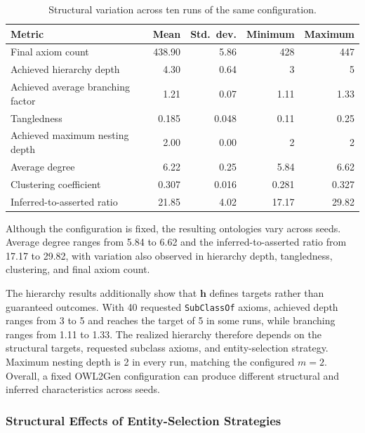 {\small
\begin{table}[htbp]
\centering
\caption{Structural variation across ten runs of the same configuration.}
\label{tab:metric-summary}
\small
\begin{tabular}{lrrrr}
\toprule
Metric & Mean & Std.\ dev. & Minimum & Maximum \\
\midrule
Final axiom count                 & 438.90 & 5.86  & 428   & 447   \\
Achieved hierarchy depth          & 4.30   & 0.64  & 3     & 5     \\
Achieved average branching factor & 1.21   & 0.07  & 1.11  & 1.33  \\
Tangledness                       & 0.185  & 0.048 & 0.11  & 0.25  \\
Achieved maximum nesting depth    & 2.00   & 0.00  & 2     & 2     \\
Average degree                    & 6.22   & 0.25  & 5.84  & 6.62  \\
Clustering coefficient            & 0.307  & 0.016 & 0.281 & 0.327 \\
Inferred-to-asserted ratio        & 21.85  & 4.02  & 17.17 & 29.82 \\
\bottomrule
\end{tabular}
\end{table}
}

Although the configuration is fixed, the resulting ontologies vary across
seeds. Average degree ranges from 5.84 to 6.62 and the inferred-to-asserted
ratio from 17.17 to 29.82, with variation also observed in hierarchy depth,
tangledness, clustering, and final axiom count.

The hierarchy results additionally show that $\mathbf{h}$ defines targets
rather than guaranteed outcomes. With 40 requested \texttt{SubClassOf}
axioms, achieved depth ranges from 3 to 5 and reaches the target of 5 in some
runs, while branching ranges from 1.11 to 1.33. The realized hierarchy
therefore depends on the structural targets, requested subclass axioms, and
entity-selection strategy. Maximum nesting depth is 2 in every run, matching
the configured $m=2$. Overall, a fixed OWL2Gen configuration can produce
different structural and inferred characteristics across seeds.


\subsubsection{Structural Effects of Entity-Selection Strategies}

